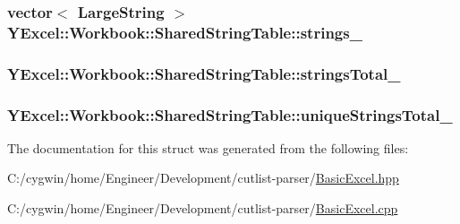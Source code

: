 \subsubsection[{strings\+\_\+}]{\setlength{\rightskip}{0pt plus 5cm}vector$<$ {\bf Large\+String} $>$ Y\+Excel\+::\+Workbook\+::\+Shared\+String\+Table\+::strings\+\_\+}\label{struct_y_excel_1_1_workbook_1_1_shared_string_table_a89a0c5de6706ee57c2dab0c6da08237a}
\hypertarget{struct_y_excel_1_1_workbook_1_1_shared_string_table_a6fc099c9ca9a2286614a57b1415d0b8b}{}
\subsubsection[{strings\+Total\+\_\+}]{ Y\+Excel\+::\+Workbook\+::\+Shared\+String\+Table\+::strings\+Total\+\_\+}\label{struct_y_excel_1_1_workbook_1_1_shared_string_table_a6fc099c9ca9a2286614a57b1415d0b8b}
\hypertarget{struct_y_excel_1_1_workbook_1_1_shared_string_table_ab4ec90981247df53fa63f719dafc0b55}{}
\subsubsection[{unique\+Strings\+Total\+\_\+}]{ Y\+Excel\+::\+Workbook\+::\+Shared\+String\+Table\+::unique\+Strings\+Total\+\_\+}\label{struct_y_excel_1_1_workbook_1_1_shared_string_table_ab4ec90981247df53fa63f719dafc0b55}


The documentation for this struct was generated from the following files\+:\begin{DoxyCompactItemize}
\item 
C\+:/cygwin/home/\+Engineer/\+Development/cutlist-\/parser/\hyperlink{_basic_excel_8hpp}{Basic\+Excel.\+hpp}\item 
C\+:/cygwin/home/\+Engineer/\+Development/cutlist-\/parser/\hyperlink{_basic_excel_8cpp}{Basic\+Excel.\+cpp}\end{DoxyCompactItemize}
